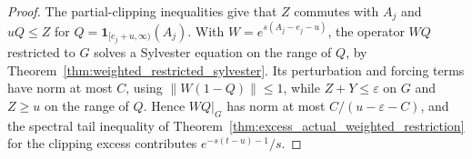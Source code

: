 \begin{proof}\leanok
    The partial-clipping inequalities give that $Z$ commutes with $A_j$ and
    $uQ\le Z$ for $Q=\mathbf1_{[e_j+u,\infty)}(A_j)$. With
    $W=e^{s(A_j-e_j-u)}$, the operator $WQ$ restricted to $G$ solves a Sylvester
    equation on the range of $Q$, by
    Theorem~\ref{thm:weighted_restricted_sylvester}. Its perturbation and forcing
    terms have norm at most $C$, using $\lVert W(1-Q)\rVert\le1$, while $Z+Y\le
    \varepsilon$ on $G$ and $Z\ge u$ on the range of $Q$. Hence $WQ|_G$ has norm at
    most $C/(u-\varepsilon-C)$, and the spectral tail inequality of
    Theorem~\ref{thm:excess_actual_weighted_restriction} for the clipping
    excess contributes $e^{-s(t-u)-1}/s$.
\end{proof}

